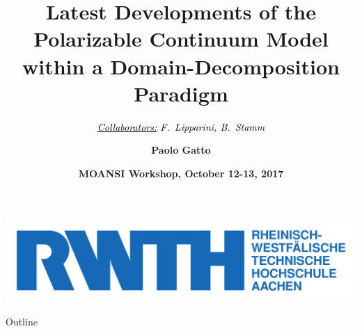 \documentclass[10pt,usenames,dvipsnames,professionalfonts]{beamer}
\author[P.~Gatto]{\bf Paolo Gatto}
\title[ddPCM]{{\bf Latest Developments of the Polarizable Continuum Model within a Domain-Decomposition Paradigm}}
\subtitle{\vspace{0.2cm}\textcolor{Black}{\it{\footnotesize \underline{Collaborators:} F.~Lipparini, B.~Stamm}}}
\date[]{{\bf MOANSI Workshop, October 12-13,  2017}}
\institute{\bf Center for Computational Engineering Science \\ RWTH Aachen}
\begin{document}



{

\begin{frame}


\begin{center}
\includegraphics[scale=0.1]{figures/rwth_logo_1}%
\end{center}

\titlepage  
\end{frame}
}

\begin{frame}{Outline}

\tableofcontents

\end{frame}



\end{document}

